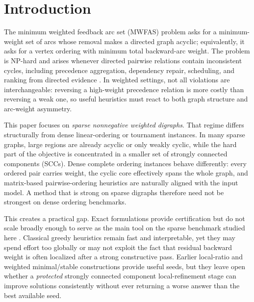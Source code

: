 \section{Introduction}
\label{sec:introduction}

The minimum weighted feedback arc set (MWFAS) problem asks for a minimum-weight set of arcs whose removal makes a directed graph acyclic; equivalently, it asks for a vertex ordering with minimum total backward-arc weight. The problem is NP-hard \cite{K72} and arises whenever directed pairwise relations contain inconsistent cycles, including precedence aggregation, dependency repair, scheduling, and ranking from directed evidence \cite{F90,ACN08}. In weighted settings, not all violations are interchangeable: reversing a high-weight precedence relation is more costly than reversing a weak one, so useful heuristics must react to both graph structure and arc-weight asymmetry.

This paper focuses on \emph{sparse nonnegative weighted digraphs}. That regime differs structurally from dense linear-ordering or tournament instances. In many sparse graphs, large regions are already acyclic or only weakly cyclic, while the hard part of the objective is concentrated in a smaller set of strongly connected components (SCCs). Dense complete ordering instances behave differently: every ordered pair carries weight, the cyclic core effectively spans the whole graph, and matrix-based pairwise-ordering heuristics are naturally aligned with the input model. A method that is strong on sparse digraphs therefore need not be strongest on dense ordering benchmarks.

This creates a practical gap. Exact formulations provide certification but do not scale broadly enough to serve as the main tool on the sparse benchmark studied here \cite{BSNA21}. Classical greedy heuristics remain fast and interpretable, yet they may spend effort too globally or may not exploit the fact that residual backward weight is often localized after a strong constructive pass. Earlier local-ratio and weighted minimal/stable constructions provide useful seeds, but they leave open whether a \emph{protected} strongly connected component local-refinement stage can improve solutions consistently without ever returning a worse answer than the best available seed.

